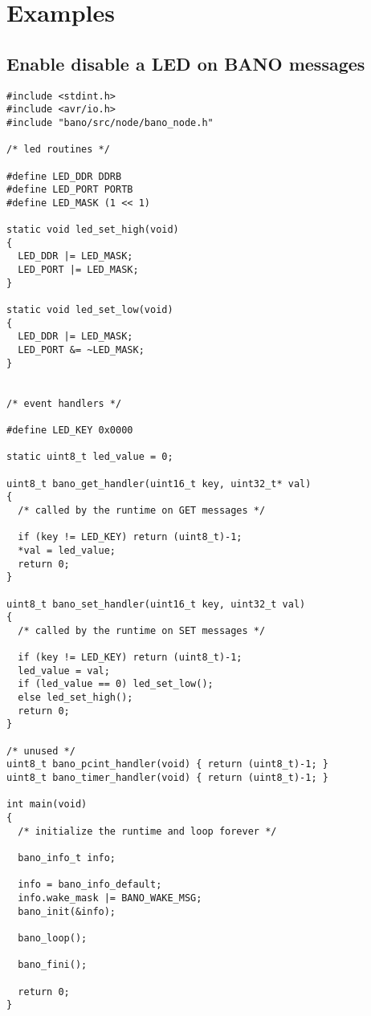\documentclass[a4paper, 11pt]{article}
\begin{document}
\clearpage
\section{Examples}

\subsection{Enable disable a LED on BANO messages}
\begin{tiny}
\begin{verbatim}
#include <stdint.h>
#include <avr/io.h>
#include "bano/src/node/bano_node.h"

/* led routines */

#define LED_DDR DDRB
#define LED_PORT PORTB
#define LED_MASK (1 << 1)

static void led_set_high(void)
{
  LED_DDR |= LED_MASK;
  LED_PORT |= LED_MASK;
}

static void led_set_low(void)
{
  LED_DDR |= LED_MASK;
  LED_PORT &= ~LED_MASK;
}


/* event handlers */

#define LED_KEY 0x0000

static uint8_t led_value = 0;

uint8_t bano_get_handler(uint16_t key, uint32_t* val)
{
  /* called by the runtime on GET messages */

  if (key != LED_KEY) return (uint8_t)-1;
  *val = led_value;
  return 0;
}

uint8_t bano_set_handler(uint16_t key, uint32_t val)
{
  /* called by the runtime on SET messages */

  if (key != LED_KEY) return (uint8_t)-1;
  led_value = val;
  if (led_value == 0) led_set_low();
  else led_set_high();
  return 0;
}

/* unused */
uint8_t bano_pcint_handler(void) { return (uint8_t)-1; }
uint8_t bano_timer_handler(void) { return (uint8_t)-1; }

int main(void)
{
  /* initialize the runtime and loop forever */

  bano_info_t info;

  info = bano_info_default;
  info.wake_mask |= BANO_WAKE_MSG;
  bano_init(&info);

  bano_loop();

  bano_fini();

  return 0;
}

\end{verbatim}
\end{tiny}
\end{document}
